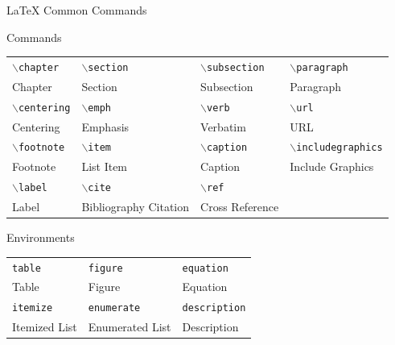 \documentclass{beamer}
\def\cmd#1{\texttt{\color{red}\footnotesize $\backslash$#1}}
\def\env#1{\texttt{\color{blue}\footnotesize #1}}
\begin{document}
\begin{frame}[fragile]{\LaTeX{} Common Commands}
    \begin{exampleblock}{Commands}
        \centering
        \footnotesize
        \begin{tabular}{llll}
            \cmd{chapter} & \cmd{section} & \cmd{subsection} & \cmd{paragraph} \\
            Chapter & Section & Subsection & Paragraph \\\hline
            \cmd{centering} & \cmd{emph} & \cmd{verb} & \cmd{url} \\
            Centering & Emphasis & Verbatim & URL \\\hline
            \cmd{footnote} & \cmd{item} & \cmd{caption} & \cmd{includegraphics} \\
            Footnote & List Item & Caption & Include Graphics \\\hline
            \cmd{label} & \cmd{cite} & \cmd{ref} \\
            Label & Bibliography Citation & Cross Reference \\\hline
        \end{tabular}
    \end{exampleblock}
    \begin{exampleblock}{Environments}
        \centering
        \footnotesize
        \begin{tabular}{lll}
            \env{table} & \env{figure} & \env{equation}\\
            Table & Figure & Equation \\\hline
            \env{itemize} & \env{enumerate} & \env{description}\\
            Itemized List & Enumerated List & Description \\\hline
        \end{tabular}
    \end{exampleblock}
\end{frame}
\end{document}
